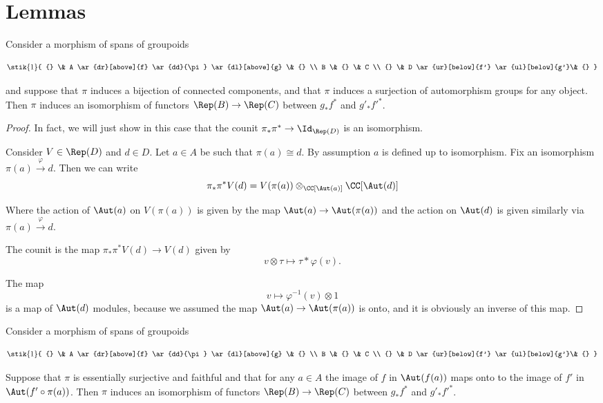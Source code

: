 \section{Lemmas}
\begin{Lemma}
\label{ontolemma}
Consider a morphism of spans of groupoids

\[
\stik{1}{
{} \& A \ar{dr}[above]{f} \ar{dd}{\pi} \ar{dl}[above]{g} \& {} \\
B \& {} \& C \\
{} \& D \ar{ur}[below]{f'} \ar{ul}[below]{g'}\& {}
}
\]

and suppose that $\pi$ induces a bijection of connected components, and that $\pi$ induces a surjection of automorphism groups for any object. Then $\pi$ induces an isomorphism of functors $\Rep(B)\rightarrow\Rep(C)$ between $g_*f^*$ and $g'_*f'^*$.
\end{Lemma}

\begin{proof}
In fact, we will just show in this case that the counit $\pi_*\pi^*\rightarrow\Id_{\Rep(D)}$ is an isomorphism.

Consider $V\in\Rep(D)$ and $d\in D$. Let $a\in A$ be such that $\pi(a)\cong d$. By assumption $a$ is defined up to isomorphism. Fix an isomorphism $\pi(a)\xrightarrow{\varphi} d$. Then we can write \[
\pi_*\pi^*V(d)=V(\pi(a))\otimes_{\CC[\Aut(a)]}\CC[\Aut(d)]
\]

Where the action of $\Aut(a)$ on $V(\pi(a))$ is given by the map $\Aut(a)\rightarrow \Aut(\pi(a))$ and the action on $\Aut(d)$ is given similarly via $\pi(a)\xrightarrow{\varphi} d$.

The counit is the map $\pi_*\pi^*V(d)\rightarrow V(d)$ given by \[
v\otimes \tau \mapsto \tau*\varphi(v).
\]

The map 
\[
v\mapsto \varphi^{-1}(v)\otimes 1
\]
is a map of $\Aut(d)$ modules, because we assumed the map $\Aut(a)\rightarrow\Aut(\pi(a))$ is onto, and it is obviously an inverse of this map.
\end{proof}

\begin{Lemma}
\label{intolemma}
Consider a morphism of spans of groupoids

\[
\stik{1}{
{} \& A \ar{dr}[above]{f} \ar{dd}{\pi} \ar{dl}[above]{g} \& {} \\
B \& {} \& C \\
{} \& D \ar{ur}[below]{f'} \ar{ul}[below]{g'}\& {}
}
\]

Suppose that $\pi$ is essentially surjective and faithful and that for any $a\in A$ the image of $f$ in $\Aut(f(a))$ maps onto to the image of $f'$ in $\Aut(f'\circ \pi(a))$. Then $\pi$ induces an isomorphism of functors $\Rep(B)\rightarrow\Rep(C)$ between $g_*f^*$ and $g'_*f'^*$.
\end{Lemma}

